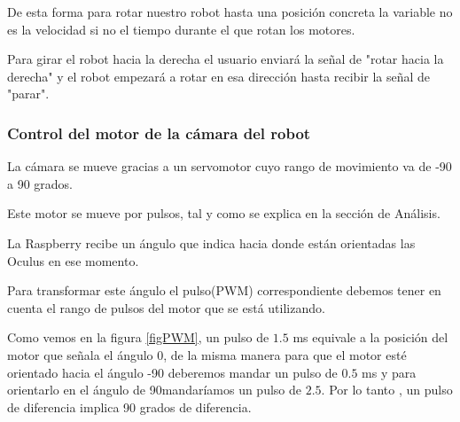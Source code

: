 \documentclass[twoside, 11pt]{epstfg}
\begin{document}
De esta forma para rotar nuestro robot hasta una posición concreta la variable no es la velocidad si no el tiempo durante el que rotan los motores.

Para girar el robot hacia la derecha el usuario enviará la señal de "rotar hacia la derecha" y el robot empezará a rotar en esa dirección hasta recibir la señal de "parar".

%
%
%



\subsubsection{\textbf{Control del motor de la cámara del robot}}

La cámara se mueve gracias a un servomotor cuyo rango de movimiento va de -90 a 90 grados.

Este motor se mueve por pulsos, tal y como se explica en la sección de Análisis.

La Raspberry recibe un ángulo que indica hacia donde están orientadas las Oculus en ese momento.

Para transformar este ángulo el pulso(PWM) correspondiente debemos tener en cuenta el rango de pulsos del motor que se está utilizando.

Como vemos en la figura \ref{figPWM}, un pulso de $1.5$ ms equivale a la posición del motor que señala el ángulo 0, de la misma manera para que el motor esté orientado hacia el ángulo -90 deberemos mandar un pulso de $0.5$ ms y para orientarlo en el ángulo de 90mandaríamos un pulso de $2.5$. Por lo tanto , un pulso de diferencia implica 90 grados de diferencia.
\end{document}
